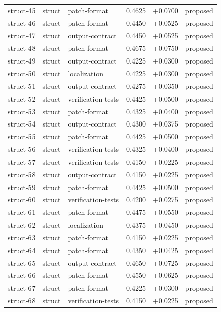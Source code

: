 \begin{center}
\begin{longtable}{llp{5.2cm}rrl}
struct-45 & struct & patch-format & 0.4625 & +0.0700 & proposed \\
struct-46 & struct & patch-format & 0.4450 & +0.0525 & proposed \\
struct-47 & struct & output-contract & 0.4450 & +0.0525 & proposed \\
struct-48 & struct & patch-format & 0.4675 & +0.0750 & proposed \\
struct-49 & struct & output-contract & 0.4225 & +0.0300 & proposed \\
struct-50 & struct & localization & 0.4225 & +0.0300 & proposed \\
struct-51 & struct & output-contract & 0.4275 & +0.0350 & proposed \\
struct-52 & struct & verification-tests & 0.4425 & +0.0500 & proposed \\
struct-53 & struct & patch-format & 0.4325 & +0.0400 & proposed \\
struct-54 & struct & output-contract & 0.4300 & +0.0375 & proposed \\
struct-55 & struct & patch-format & 0.4425 & +0.0500 & proposed \\
struct-56 & struct & verification-tests & 0.4325 & +0.0400 & proposed \\
struct-57 & struct & verification-tests & 0.4150 & +0.0225 & proposed \\
struct-58 & struct & output-contract & 0.4150 & +0.0225 & proposed \\
struct-59 & struct & patch-format & 0.4425 & +0.0500 & proposed \\
struct-60 & struct & verification-tests & 0.4200 & +0.0275 & proposed \\
struct-61 & struct & patch-format & 0.4475 & +0.0550 & proposed \\
struct-62 & struct & localization & 0.4375 & +0.0450 & proposed \\
struct-63 & struct & patch-format & 0.4150 & +0.0225 & proposed \\
struct-64 & struct & patch-format & 0.4350 & +0.0425 & proposed \\
struct-65 & struct & output-contract & 0.4650 & +0.0725 & proposed \\
struct-66 & struct & patch-format & 0.4550 & +0.0625 & proposed \\
struct-67 & struct & patch-format & 0.4225 & +0.0300 & proposed \\
struct-68 & struct & verification-tests & 0.4150 & +0.0225 & proposed \\

\end{longtable}
\end{center}
